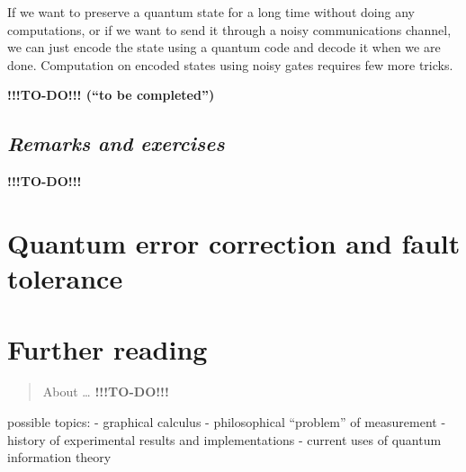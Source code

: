 \documentclass[fleqn]{article}
\let\oldsection\section
\renewcommand\section{\clearpage\oldsection}
\begin{document}
If we want to preserve a quantum state for a long time without doing any computations, or if we want to send it through a noisy communications channel, we can just encode the state using a quantum code and decode it when we are done.
Computation on encoded states using noisy gates requires few more tricks.

\textbf{!!!TO-DO!!! (``to be completed'')}

\hypertarget{remarks-and-exercises-9}{%
\subsection{\texorpdfstring{\emph{Remarks and exercises}}{Remarks and exercises}}\label{remarks-and-exercises-9}}

\textbf{!!!TO-DO!!!}

\hypertarget{chapter12}{%
\section{Quantum error correction and fault tolerance}\label{chapter12}}

\hypertarget{chapter13}{%
\section{Further reading}\label{chapter13}}

\begin{quote}
About \ldots{} \textbf{!!!TO-DO!!!}
\end{quote}

possible topics:
- graphical calculus
- philosophical ``problem'' of measurement
- history of experimental results and implementations
- current uses of quantum information theory
\end{document}
